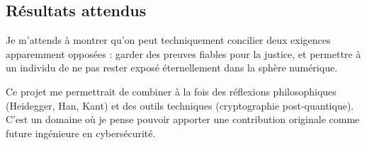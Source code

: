 \documentclass[12pt,a4paper]{report}
\begin{document}
	\subsection*{Résultats attendus}
	
	Je m’attends à montrer qu’on peut techniquement concilier deux exigences 
	apparemment opposées : garder des preuves fiables pour la justice, et permettre 
	à un individu de ne pas rester exposé éternellement dans la sphère numérique.
	

	
	Ce projet me permettrait de combiner à la fois des réflexions philosophiques 
	(Heidegger, Han, Kant) et des outils techniques (cryptographie post-quantique). 
	C’est un domaine où je pense pouvoir apporter une contribution originale 
	comme future ingénieure en cybersécurité.
	
	
\end{document}
